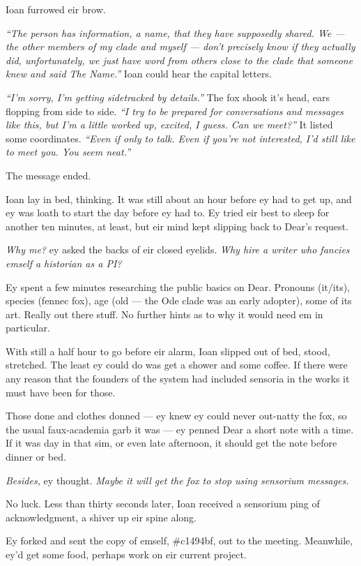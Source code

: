 Ioan furrowed eir brow.

\emph{``The person has information, a name, that they have supposedly shared. We --- the other members of my clade and myself --- don't precisely know if they actually did, unfortunately, we just have word from others close to the clade that someone knew and said The Name.''} Ioan could hear the capital letters.

\emph{``I'm sorry, I'm getting sidetracked by details.''} The fox shook it's head, ears flopping from side to side. \emph{``I try to be prepared for conversations and messages like this, but I'm a little worked up, excited, I guess. Can we meet?''} It listed some coordinates. \emph{``Even if only to talk. Even if you're not interested, I'd still like to meet you. You seem neat.''}

The message ended.

Ioan lay in bed, thinking. It was still about an hour before ey had to get up, and ey was loath to start the day before ey had to. Ey tried eir best to sleep for another ten minutes, at least, but eir mind kept slipping back to Dear's request.

\emph{Why me?} ey asked the backs of eir closed eyelids. \emph{Why hire a writer who fancies emself a historian as a PI?}

Ey spent a few minutes researching the public basics on Dear. Pronouns (it/its), species (fennec fox), age (old --- the Ode clade was an early adopter), some of its art. Really out there stuff. No further hints as to why it would need em in particular.

With still a half hour to go before eir alarm, Ioan slipped out of bed, stood, stretched. The least ey could do was get a shower and some coffee. If there were any reason that the founders of the system had included sensoria in the works it must have been for those.

Those done and clothes donned --- ey knew ey could never out-natty the fox, so the usual faux-academia garb it was --- ey penned Dear a short note with a time. If it was day in that sim, or even late afternoon, it should get the note before dinner or bed.

\emph{Besides,} ey thought. \emph{Maybe it will get the fox to stop using sensorium messages.}

No luck. Less than thirty seconds later, Ioan received a sensorium ping of acknowledgment, a shiver up eir spine along.

Ey forked and sent the copy of emself, \#c1494bf, out to the meeting. Meanwhile, ey'd get some food, perhaps work on eir current project.
